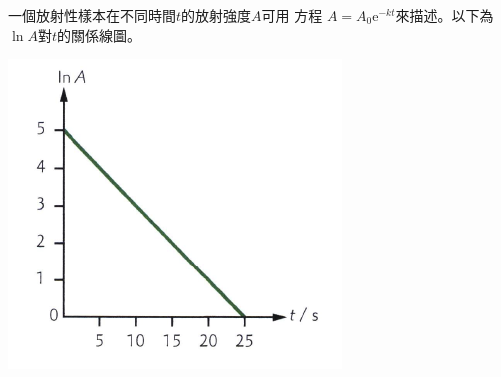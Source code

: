 {
    一個放射性樣本在不同時間$t$的放射強度$A$可用 方程 $A=A_0\textrm{e}^{-kt}$來描述。以下為$\ln A$對$t$的關係線圖。
    \par{\par\centering\includegraphics[width=.4\textwidth]{./img/ch2_decay_lq_2024-06-17-23-01-22.png}\par}
    }
